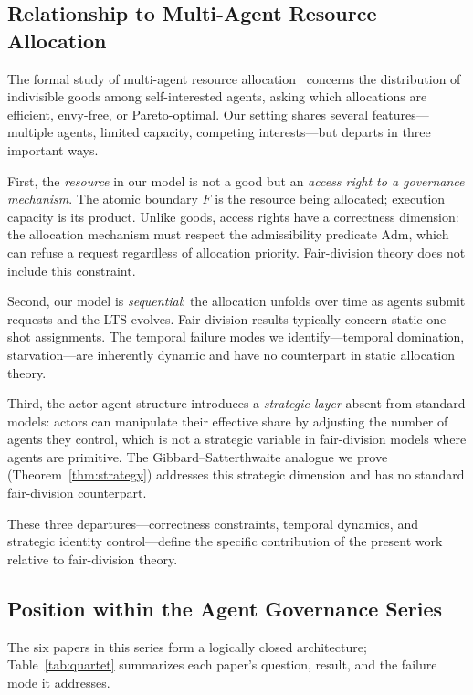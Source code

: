\documentclass[11pt]{article}
\theoremstyle{plain}
\theoremstyle{definition}
\theoremstyle{remark}
\newcommand{\Adm}{\mathrm{Adm}}
\begin{document}
\subsection{Relationship to Multi-Agent Resource Allocation}
\label{sec:related-marl}

The formal study of multi-agent resource allocation~\citep{chevaleyre06}
concerns the distribution of indivisible goods among self-interested
agents, asking which allocations are efficient, envy-free, or
Pareto-optimal.  Our setting shares several features---multiple agents,
limited capacity, competing interests---but departs in three important
ways.

First, the \emph{resource} in our model is not a good but an
\emph{access right to a governance mechanism}.  The atomic boundary $F$
is the resource being allocated; execution capacity is its product.
Unlike goods, access rights have a correctness dimension: the allocation
mechanism must respect the admissibility predicate $\Adm$, which can
refuse a request regardless of allocation priority.  Fair-division theory
does not include this constraint.

Second, our model is \emph{sequential}: the allocation unfolds over time
as agents submit requests and the LTS evolves.  Fair-division results
typically concern static one-shot assignments.  The temporal failure
modes we identify---temporal domination, starvation---are inherently
dynamic and have no counterpart in static allocation theory.

Third, the actor-agent structure introduces a \emph{strategic layer}
absent from standard models: actors can manipulate their effective
share by adjusting the number of agents they control, which is not a
strategic variable in fair-division models where agents are primitive.
The Gibbard--Satterthwaite analogue we prove (Theorem~\ref{thm:strategy})
addresses this strategic dimension and has no standard fair-division
counterpart.

These three departures---correctness constraints, temporal dynamics, and
strategic identity control---define the specific contribution of the
present work relative to fair-division theory.

\subsection{Position within the Agent Governance Series}
\label{sec:related-quartet}

The six papers in this series form a logically closed architecture;
Table~\ref{tab:quartet} summarizes each paper's question, result, and
the failure mode it addresses.
\end{document}
